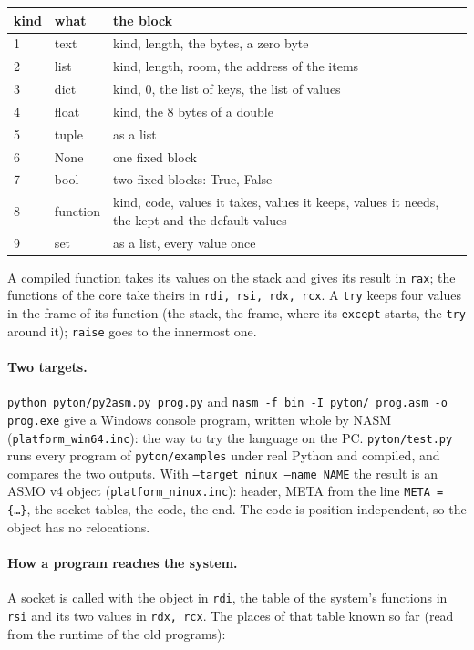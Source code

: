 \documentclass[11pt,a4paper]{article}
\newcommand{\file}[1]{\texttt{#1}}
\begin{document}
\begin{longtable}{@{}l l p{9.5cm}@{}}
\toprule
kind & what & the block \\ \midrule
1 & text & kind, length, the bytes, a zero byte \\
2 & list & kind, length, room, the address of the items \\
3 & dict & kind, 0, the list of keys, the list of values \\
4 & float & kind, the 8 bytes of a double \\
5 & tuple & as a list \\
6 & None & one fixed block \\
7 & bool & two fixed blocks: True, False \\
8 & function & kind, code, values it takes, values it keeps, values it needs, the kept and the
               default values \\
9 & set & as a list, every value once \\
\bottomrule
\end{longtable}

\noindent A compiled function takes its values on the stack and gives its result in \texttt{rax};
the functions of the core take theirs in \texttt{rdi, rsi, rdx, rcx}. A \texttt{try} keeps four
values in the frame of its function (the stack, the frame, where its \texttt{except} starts, the
\texttt{try} around it); \texttt{raise} goes to the innermost one.

\paragraph{Two targets.}
\texttt{python pyton/py2asm.py prog.py} and \texttt{nasm -f bin -I pyton/ prog.asm -o prog.exe} give a
Windows console program, written whole by NASM (\file{platform\_win64.inc}): the way to try the
language on the PC. \file{pyton/test.py} runs every program of \file{pyton/examples} under real
Python and compiled, and compares the two outputs.
With \texttt{--target ninux --name NAME} the result is an ASMO v4 object
(\file{platform\_ninux.inc}): header, META from the line \texttt{META = \{\ldots\}}, the socket
tables, the code, the end. The code is position-independent, so the object has no relocations.

\paragraph{How a program reaches the system.} A socket is called with the object in \texttt{rdi},
the table of the system's functions in \texttt{rsi} and its two values in \texttt{rdx, rcx}. The
places of that table known so far (read from the runtime of the old programs):
\end{document}
